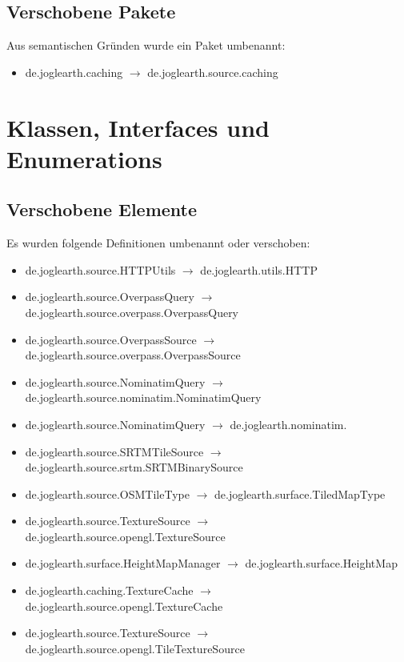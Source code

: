 \documentclass[10pt]{scrreprt}
\begin{document}
\subsection*{Verschobene Pakete}
Aus semantischen Gründen wurde ein Paket umbenannt:
\begin{itemize}
\item de.joglearth.caching $ \rightarrow $ de.joglearth.source.caching
\end{itemize}

\section{Klassen, Interfaces und Enumerations}

\subsection*{Verschobene Elemente}
Es wurden folgende Definitionen umbenannt oder verschoben:

\begin{itemize}
\item de.joglearth.source.HTTPUtils $ \rightarrow $ de.joglearth.utils.HTTP
\item de.joglearth.source.OverpassQuery $ \rightarrow $ de.joglearth.source.overpass.OverpassQuery
\item de.joglearth.source.OverpassSource $ \rightarrow $ de.joglearth.source.overpass.OverpassSource
\item de.joglearth.source.NominatimQuery $ \rightarrow $ de.joglearth.source.nominatim.NominatimQuery
\item de.joglearth.source.NominatimQuery $ \rightarrow $ de.joglearth.nominatim.
\item de.joglearth.source.SRTMTileSource $ \rightarrow $ de.joglearth.source.srtm.SRTMBinarySource
\item de.joglearth.source.OSMTileType $ \rightarrow $ de.joglearth.surface.TiledMapType
\item de.joglearth.source.TextureSource $ \rightarrow $ de.joglearth.source.opengl.TextureSource
\item de.joglearth.surface.HeightMapManager $ \rightarrow $ de.joglearth.surface.HeightMap
\item de.joglearth.caching.TextureCache $ \rightarrow $ de.joglearth.source.opengl.TextureCache
\item de.joglearth.source.TextureSource $ \rightarrow $ de.joglearth.source.opengl.TileTextureSource
\end{itemize}
\end{document}
